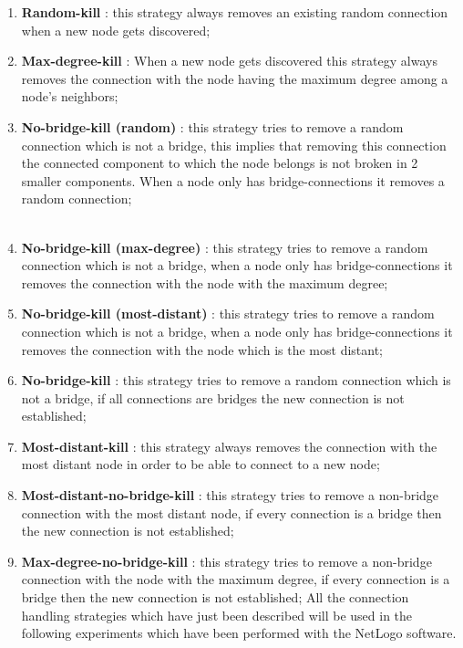 \documentclass{llncs}
\begin{document}
\begin{enumerate}
	\item \textbf{Random-kill} : this strategy always removes an existing random connection when a new node gets discovered;
	\\
	\item \textbf{Max-degree-kill} : When a new node gets discovered this strategy always removes the connection with the node having the maximum degree among a node's neighbors;
	\\
	\item \textbf{No-bridge-kill (random)} : this strategy tries to remove a random connection which is not a bridge, this implies that removing this connection the connected component to which the node belongs is not broken in 2 smaller components. When a node only has bridge-connections it removes a random connection;
	\\\\
	\item \textbf{No-bridge-kill (max-degree)} : this strategy tries to remove a random connection which is not a bridge, when a node only has bridge-connections it removes the connection with the node with the maximum degree;
	\\
	\item \textbf{No-bridge-kill (most-distant)} : this strategy tries to remove a random connection which is not a bridge, when a node only has bridge-connections it removes the connection with the node which is the most distant;
	\\
	\item \textbf{No-bridge-kill} : this strategy tries to remove a random connection which is not a bridge, if all connections are bridges the new connection is not established;
	\\
	\item \textbf{Most-distant-kill} : this strategy always removes the connection with the most distant node in order to be able to connect to a new node;
	\\
	\item \textbf{Most-distant-no-bridge-kill} : this strategy tries to remove a non-bridge connection with the most distant node, if every connection is a bridge then the new connection is not established;
	\\
	\item \textbf{Max-degree-no-bridge-kill} : this strategy tries to remove a non-bridge connection with the node with the maximum degree, if every connection is a bridge then the new connection is not established;
	All the connection handling strategies which have just been described will be used in the following experiments which have been performed with the NetLogo software.
	
\end{enumerate}
%
\end{document}
